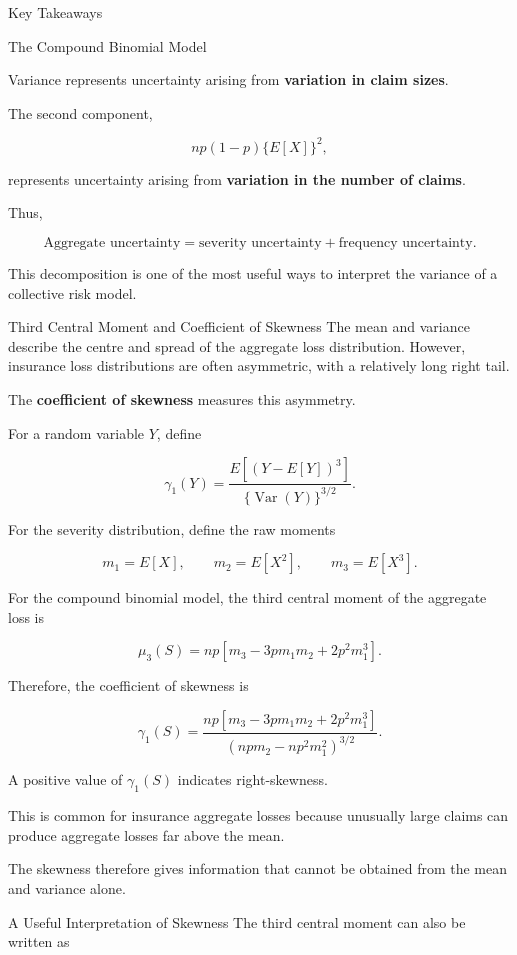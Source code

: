 \documentclass[
  ignorenonframetext,
  aspectratio=169,
]{beamer}
\begin{document}
\begin{frame}{Key Takeaways}
\begin{block}{The Compound Binomial Model}
\begin{block}{Variance}
represents uncertainty arising from \textbf{variation in claim sizes}.

The second component,

\[
np(1-p)\{E[X]\}^2,
\]

represents uncertainty arising from \textbf{variation in the number of
claims}.

Thus,

\[
\boxed{
\text{Aggregate uncertainty}
=
\text{severity uncertainty}
+
\text{frequency uncertainty}.
}
\]

This decomposition is one of the most useful ways to interpret the
variance of a collective risk model.
\end{block}

\begin{block}{Third Central Moment and Coefficient of Skewness}
\protect{}\label{third-central-moment-and-coefficient-of-skewness}
The mean and variance describe the centre and spread of the aggregate
loss distribution. However, insurance loss distributions are often
asymmetric, with a relatively long right tail.

The \textbf{coefficient of skewness} measures this asymmetry.

For a random variable \(Y\), define

\[
\gamma_1(Y)
=
\frac{E[(Y-E[Y])^3]}
{\{\operatorname{Var}(Y)\}^{3/2}}.
\]

For the severity distribution, define the raw moments

\[
m_1=E[X],
\qquad
m_2=E[X^2],
\qquad
m_3=E[X^3].
\]

For the compound binomial model, the third central moment of the
aggregate loss is

\[
\boxed{
\mu_3(S)
=
np\left[
m_3-3pm_1m_2+2p^2m_1^3
\right].
}
\]

Therefore, the coefficient of skewness is

\[
\boxed{
\gamma_1(S)
=
\frac{
np\left[
m_3-3pm_1m_2+2p^2m_1^3
\right]
}{
\left(
npm_2-np^2m_1^2
\right)^{3/2}
}.
}
\]

A positive value of \(\gamma_1(S)\) indicates right-skewness.

This is common for insurance aggregate losses because unusually large
claims can produce aggregate losses far above the mean.

The skewness therefore gives information that cannot be obtained from
the mean and variance alone.
\end{block}

\begin{block}{A Useful Interpretation of Skewness}
\protect{}\label{a-useful-interpretation-of-skewness}
The third central moment can also be written as


\end{block}
\end{block}
\end{frame}
\end{document}
